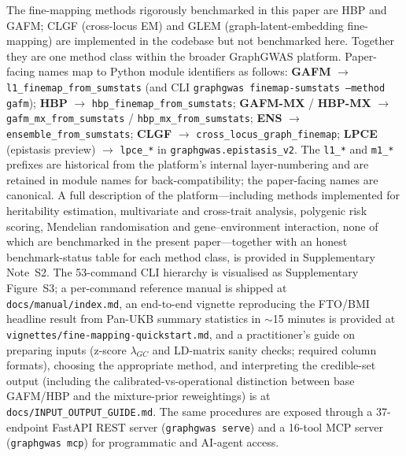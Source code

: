 The fine-mapping methods rigorously benchmarked in this paper are
HBP and GAFM; CLGF (cross-locus EM) and GLEM (graph-latent-embedding
fine-mapping) are implemented in the codebase but not benchmarked
here. Together they are one method class within the broader
GraphGWAS platform. Paper-facing names map to Python module
identifiers as follows: \textbf{GAFM} $\rightarrow$
\texttt{l1\_finemap\_from\_sumstats} (and CLI
\texttt{graphgwas finemap-sumstats --method gafm});
\textbf{HBP} $\rightarrow$ \texttt{hbp\_finemap\_from\_sumstats};
\textbf{GAFM-MX} / \textbf{HBP-MX} $\rightarrow$
\texttt{gafm\_mx\_from\_sumstats} / \texttt{hbp\_mx\_from\_sumstats};
\textbf{ENS} $\rightarrow$ \texttt{ensemble\_from\_sumstats};
\textbf{CLGF} $\rightarrow$ \texttt{cross\_locus\_graph\_finemap};
\textbf{LPCE} (epistasis preview) $\rightarrow$ \texttt{lpce\_*}
in \texttt{graphgwas.epistasis\_v2}. The \texttt{l1\_*} and
\texttt{m1\_*} prefixes are historical from the platform's
internal layer-numbering and are retained in module names for
back-compatibility; the paper-facing names are canonical.
A full description of the platform---including methods implemented
for heritability estimation, multivariate and cross-trait analysis,
polygenic risk scoring, Mendelian randomisation and
gene--environment interaction, none of which are benchmarked in
the present paper---together with an honest benchmark-status table
for each method class, is provided in Supplementary Note~S2. The
53-command CLI hierarchy is visualised as Supplementary
Figure~S3; a per-command reference manual is shipped at
\texttt{docs/manual/index.md}, an end-to-end vignette
reproducing the FTO/BMI headline result from Pan-UKB summary
statistics in $\sim$15 minutes is provided at
\texttt{vignettes/fine-mapping-quickstart.md}, and a
practitioner's guide on preparing inputs (z-score $\lambda_{GC}$
and LD-matrix sanity checks; required column formats), choosing
the appropriate method, and interpreting the credible-set output
(including the calibrated-vs-operational distinction between
base GAFM/HBP and the mixture-prior reweightings) is at
\texttt{docs/INPUT\_OUTPUT\_GUIDE.md}. The same procedures
are exposed through a 37-endpoint FastAPI REST server
(\texttt{graphgwas serve}) and a 16-tool MCP server
(\texttt{graphgwas mcp}) for programmatic and AI-agent access.
